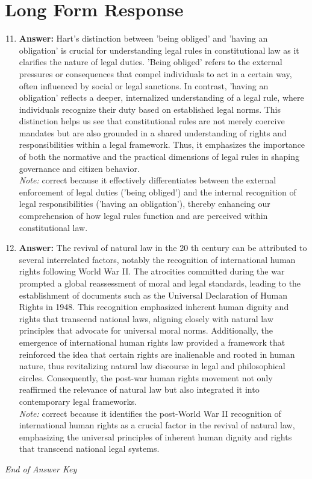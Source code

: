 \documentclass[12pt]{article}
\begin{document}
\section*{Long Form Response}
\begin{enumerate}[label=\arabic*.]
\setcounter{enumi}{10}
\item \textbf{Answer:} Hart's distinction between 'being obliged' and 'having an obligation' is crucial for understanding legal rules in constitutional law as it clarifies the nature of legal duties. 'Being obliged' refers to the external pressures or consequences that compel individuals to act in a certain way, often influenced by social or legal sanctions. In contrast, 'having an obligation' reflects a deeper, internalized understanding of a legal rule, where individuals recognize their duty based on established legal norms. This distinction helps us see that constitutional rules are not merely coercive mandates but are also grounded in a shared understanding of rights and responsibilities within a legal framework. Thus, it emphasizes the importance of both the normative and the practical dimensions of legal rules in shaping governance and citizen behavior.
\\ \textit{Note:} correct because it effectively differentiates between the external enforcement of legal duties ('being obliged') and the internal recognition of legal responsibilities ('having an obligation'), thereby enhancing our comprehension of how legal rules function and are perceived within constitutional law.
\item \textbf{Answer:} The revival of natural law in the 20 th century can be attributed to several interrelated factors, notably the recognition of international human rights following World War II. The atrocities committed during the war prompted a global reassessment of moral and legal standards, leading to the establishment of documents such as the Universal Declaration of Human Rights in 1948. This recognition emphasized inherent human dignity and rights that transcend national laws, aligning closely with natural law principles that advocate for universal moral norms. Additionally, the emergence of international human rights law provided a framework that reinforced the idea that certain rights are inalienable and rooted in human nature, thus revitalizing natural law discourse in legal and philosophical circles. Consequently, the post-war human rights movement not only reaffirmed the relevance of natural law but also integrated it into contemporary legal frameworks.
\\ \textit{Note:} correct because it identifies the post-World War II recognition of international human rights as a crucial factor in the revival of natural law, emphasizing the universal principles of inherent human dignity and rights that transcend national legal systems.
\end{enumerate}

\vfill
\noindent\textit{End of Answer Key}
\end{document}
